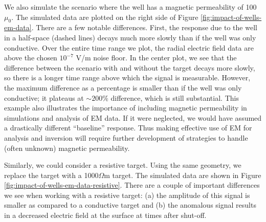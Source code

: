 \documentclass[
    paper
]{geophysics}
\begin{document}


We also simulate the scenario where the well has a magnetic permeability of 100 $\mu_0$. The simulated data are plotted on the right side of Figure \ref{fig:impact-of-wells-em-data}. There are a few notable differences. First, the response due to the well in a half-space (dashed lines) decays much more slowly than if the well was only conductive. Over the entire time range we plot, the radial electric field data are above the chosen $10^{-7}$ V/m noise floor. In the center plot, we see that the difference between the scenario with and without the target decays more slowly, so there is a longer time range above which the signal is measurable. However, the maximum difference as a percentage is smaller than if the well was only conductive; it plateaus at $\sim200\%$ difference, which is still substantial. This example also illustrates the importance of including magnetic permeability in simulations and analysis of EM data. If it were neglected, we would have assumed a drastically different ``baseline'' response. Thus making effective use of EM for analysis and inversion will require further development of strategies to handle (often unknown) magnetic permeability.

Similarly, we could consider a resistive target. Using the same geometry, we replace the target with a 1000$\Omega$m target. The simulated data are shown in Figure \ref{fig:impact-of-wells-em-data-resistive}. There are a couple of important differences we see when working with a resistive target: (a) the amplitude of this signal is smaller as compared to a conductive target and (b) the anomalous signal results in a decreased electric field at the surface at times after shut-off.



\end{document}
